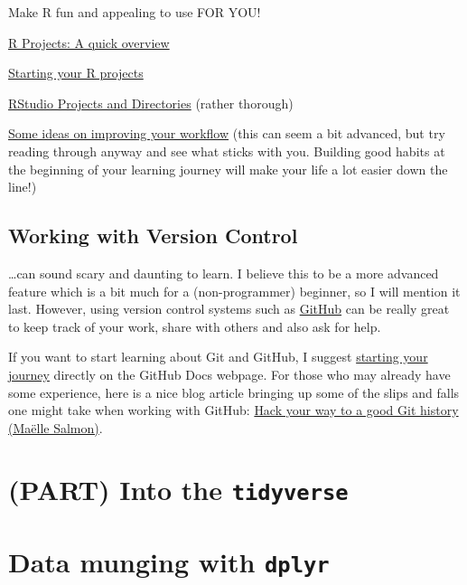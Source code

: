 \documentclass[
]{book}
\begin{document}
Make R fun and appealing to use FOR YOU!

\href{https://thedavidchen.github.io/post/rstudio-why-use-projects/}{R Projects: A quick overview}

\href{https://bookdown.org/daniel_dauber_io/r4np_book/starting-your-r-projects.html}{Starting your R projects}

\href{https://martinctc.github.io/blog/rstudio-projects-and-working-directories-a-beginner's-guide/}{RStudio Projects and Directories} (rather thorough)

\href{https://www.tidyverse.org/blog/2017/12/workflow-vs-script/}{Some ideas on improving your workflow} (this can seem a bit advanced, but try reading through anyway and see what sticks with you. Building good habits at the beginning of your learning journey will make your life a lot easier down the line!)

\section*{Working with Version Control}\label{working-with-version-control}

\ldots can sound scary and daunting to learn.
I believe this to be a more advanced feature which is a bit much for a (non-programmer) beginner, so I will mention it last.
However, using version control systems such as \href{https://github.com/}{GitHub} can be really great to keep track of your work, share with others and also ask for help.

If you want to start learning about Git and GitHub, I suggest \href{https://docs.github.com/en/get-started/start-your-journey/about-github-and-git}{starting your journey} directly on the GitHub Docs webpage.
For those who may already have some experience, here is a nice blog article bringing up some of the slips and falls one might take when working with GitHub: \href{https://www.r-bloggers.com/2024/06/hack-your-way-to-a-good-git-history/}{Hack your way to a good Git history (Maëlle Salmon)}.

\chapter*{\texorpdfstring{(PART) Into the \texttt{tidyverse}}{(PART) Into the tidyverse}}\label{part-into-the-tidyverse}

\chapter{\texorpdfstring{Data munging with \texttt{dplyr}}{Data munging with dplyr}}\label{dplyr}
\end{document}
